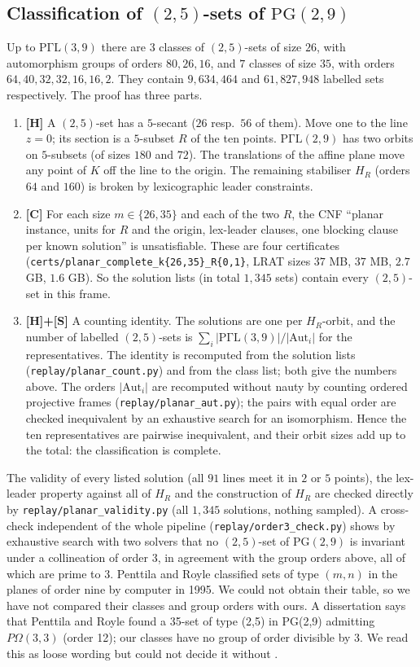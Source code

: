 \documentclass[11pt]{article}
\theoremstyle{plain}
\theoremstyle{remark}
\newcommand{\PG}{\mathrm{PG}}
\newcommand{\PGL}{\mathrm{P\Gamma L}}
\newcommand{\file}[1]{\texttt{#1}}
\begin{document}
\subsection{Classification of $(2,5)$-sets of $\PG(2,9)$}\label{sec:planar}
Up to $\PGL(3,9)$ there are $3$ classes of $(2,5)$-sets of size $26$, with automorphism groups of orders $80,26,16$, and $7$ classes of size $35$, with orders $64,40,32,32,16,16,2$.
They contain $9{,}634{,}464$ and $61{,}827{,}948$ labelled sets respectively.
The proof has three parts.
\begin{enumerate}[label=(\roman*)]
\item \textbf{[H]} A $(2,5)$-set has a $5$-secant ($26$ resp.\ $56$ of them).
Move one to the line $z=0$; its section is a $5$-subset $R$ of the ten points.
$\PGL(2,9)$ has two orbits on $5$-subsets (of sizes $180$ and $72$).
The translations of the affine plane move any point of $K$ off the line to the origin.
The remaining stabiliser $H_R$ (orders $64$ and $160$) is broken by lexicographic leader constraints.
\item \textbf{[C]} For each size $m\in\{26,35\}$ and each of the two $R$, the CNF ``planar instance, units for $R$ and the origin, lex-leader clauses, one blocking clause per known solution'' is unsatisfiable.
These are four certificates (\file{certs/planar\_complete\_k\{26,35\}\_R\{0,1\}}, LRAT sizes $37$ MB, $37$ MB, $2.7$ GB, $1.6$ GB).
So the solution lists (in total $1{,}345$ sets) contain every $(2,5)$-set in this frame.
\item \textbf{[H]+[S]} A counting identity.
The solutions are one per $H_R$-orbit, and the number of labelled $(2,5)$-sets is $\sum_i|\PGL(3,9)|/|\mathrm{Aut}_i|$ for the representatives.
The identity is recomputed from the solution lists (\file{replay/planar\_count.py}) and from the class list; both give the numbers above.
The orders $|\mathrm{Aut}_i|$ are recomputed without nauty by counting ordered projective frames (\file{replay/planar\_aut.py}); the pairs with equal order are checked inequivalent by an exhaustive search for an isomorphism.
Hence the ten representatives are pairwise inequivalent, and their orbit sizes add up to the total: the classification is complete.
\end{enumerate}
The validity of every listed solution (all $91$ lines meet it in $2$ or $5$ points), the lex-leader property against all of $H_R$ and the construction of $H_R$ are checked directly by \file{replay/planar\_validity.py} (all $1{,}345$ solutions, nothing sampled).
A cross-check independent of the whole pipeline (\file{replay/order3\_check.py}) shows by exhaustive search with two solvers that no $(2,5)$-set of $\PG(2,9)$ is invariant under a collineation of order $3$, in agreement with the group orders above, all of which are prime to $3$.
Penttila and Royle \cite{PR} classified sets of type $(m,n)$ in the planes of order nine by computer in 1995.
We could not obtain their table, so we have not compared their classes and group orders with ours.
A dissertation \cite{LH} says that Penttila and Royle found a 35-set of type (2,5) in PG(2,9) admitting $P\Omega(3,3)$ (order 12); our classes have no group of order divisible by 3. We read this as loose wording but could not decide it without \cite{PR}.
\end{document}
